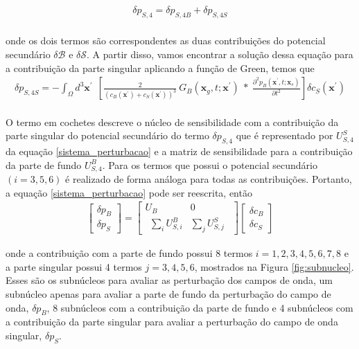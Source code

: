 \begin{eqnarray}
 \delta p_{S,4} = \delta p_{S,4B} + \delta p_{S,4S}
 \label{eq:contribuicao1}
\end{eqnarray}
\\
onde os dois termos são correspondentes as duas contribuições do potencial secundário $\delta \mathcal{B}$ e $\delta \mathcal{S}$. A partir disso, vamos encontrar a solução dessa equação para a contribuição da parte singular aplicando a função de Green, temos que \\
\begin{eqnarray}
 \delta p_{S,4S} = - \int_{\Omega} d^{3} \mathbf{x}^{\prime} ~~ \left [ \frac{2}{\left(c_{B}(\mathbf{x}^{\prime}) + c_{S}(\mathbf{x}^{\prime}) \right)^{3}}~G_{B}(\mathbf{x}_{g},t;\mathbf{x}^{\prime})~*~ \frac{\partial ^{2} p_{B}(\mathbf{x}^{\prime},t;\mathbf{x}_{s})}{\partial t^{2}} \right ] \delta c_{S}(\mathbf{x}^{\prime})  
\end{eqnarray}
 \\
O termo em cochetes descreve o núcleo de sensibilidade com a contribuição da parte singular do potencial secundário do termo $\delta p_{S,4}$ que é representado por $U^{S}_{S,4}$ da equação \ref{sistema_perturbacao} e a matriz de sensibilidade para a contribuição da parte de fundo $U^{B}_{S,4}$. Para os  termos que possui o potencial secundário $(i=3,5,6)$ é realizado de forma análoga para todas as contribuições. Portanto, a equação \ref{sistema_perturbacao} pode ser reescrita, então \\
 \begin{eqnarray}
 \begin{bmatrix}
   \delta p_{B}  \\
   \delta p_{S}
\end{bmatrix}
=
\begin{bmatrix}
 {U}_{B}      & 0   \\ 
~~ \sum_{i}{U}_{S,i}^{B}  & \sum_{j}{U}_{S,j}^{S}~~
\end{bmatrix}
\begin{bmatrix}
    {\delta c}_{B}  \\
   {\delta c}_{S}
\end{bmatrix}
\label{sistema_perturbacao}
\end{eqnarray}

onde a contribuição com a parte de fundo possui 8 termos $i=1,2,3,4,5,6,7,8$ e a parte singular possui 4 termos $j=3,4,5,6$, mostrados na Figura \ref{fig:subnucleo}. Esses são os subnúcleos para avaliar as perturbação dos campos de onda, um subnúcleo apenas para avaliar a parte de fundo da perturbação do campo de onda, $\delta p_{B}$, 8 subnúcleos com a contribuição da parte de fundo e 4 subnúcleos com a contribuição da parte singular para avaliar a perturbação do campo de onda singular, $\delta p_{S}$. 


